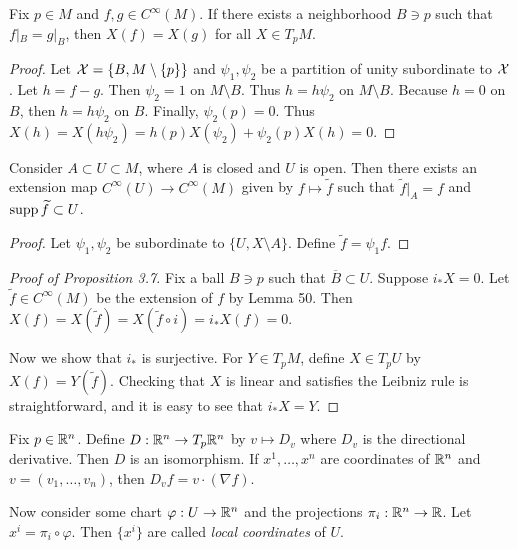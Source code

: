 \documentclass[twoside, 10pt]{article}
\begin{document}
    \begin{lem}
        Fix $p \in M$ and $f,g \in C^{\infty}(M)$. If there exists a neighborhood $B \ni p$ such that $f|_B = g|_B$, then $X(f) = X(g)$ for all $X \in T_pM$.
    \end{lem}

    \begin{proof}
        Let $\mathcal{X} = \{B, M \setminus \{p\}\}$ and $\psi_1, \psi_2$ be a partition of unity subordinate to $\mathcal{X}$. Let $h = f-g$. Then $\psi_2 = 1$ on $M \setminus B$. Thus $h=h\psi_2$ on $M \setminus B$. Because $h=0$ on $B$, then $h = h \psi_2$ on $B$. Finally, $\psi_2(p) = 0$. Thus $X(h) = X(h \psi_2) = h(p)X(\psi_2)+\psi_2(p)X(h) = 0$.
    \end{proof}

    \begin{lem}
        Consider $A \subset U \subset M$, where $A$ is closed and $U$ is open. Then there exists an extension map $C^{\infty}(U) \to C^{\infty}(M)$ given by $f \mapsto \widetilde{f}$ such that $\widetilde{f}|_A = f$ and $\operatorname{supp} \widetilde{f} \subset U$.
    \end{lem}

    \begin{proof}
        Let $\psi_1, \psi_2$ be subordinate to $\{U, X \setminus A\}$. Define $\widetilde{f} = \psi_1 f$.
    \end{proof}

    \begin{proof}[Proof of Proposition 3.7]
        Fix a ball $B \ni p$ such that $\overline{B} \subset U$. Suppose $i_*X = 0$. Let $\widetilde{f} \in C^{\infty}(M)$ be the extension of $f$ by Lemma 50. Then $X(f)=X(\widetilde{f}) = X(\widetilde{f} \circ i) = i_*X(f) = 0$.

        Now we show that $i_*$ is surjective. For $Y \in T_pM$, define $X \in T_pU$ by $X(f) = Y(\widetilde{f})$. Checking that $X$ is linear and satisfies the Leibniz rule is straightforward, and it is easy to see that $i_*X = Y$.
    \end{proof}

    \begin{prop}
        Fix $p \in \mathbb{R}^n$. Define $D: \mathbb{R}^n \to T_p \mathbb{R}^n$ by $v \mapsto D_v$ where $D_v$ is the directional derivative. Then $D$ is an isomorphism. If $x^1, \ldots, x^n$ are coordinates of $\mathbb{R}^n$ and $v = (v_1, \ldots, v_n)$, then $D_v f = v \cdot ( \nabla f )$.
    \end{prop}

    \begin{defn}
        Now consider some chart $\varphi:U \to \mathbb{R}^n$ and the projections $\pi_i:\mathbb{R}^n \to \mathbb{R}$. Let $x^i = \pi_i \circ \varphi$. Then $\{x^i\}$ are called \textit{local coordinates} of $U$.
    \end{defn}
\end{document}
